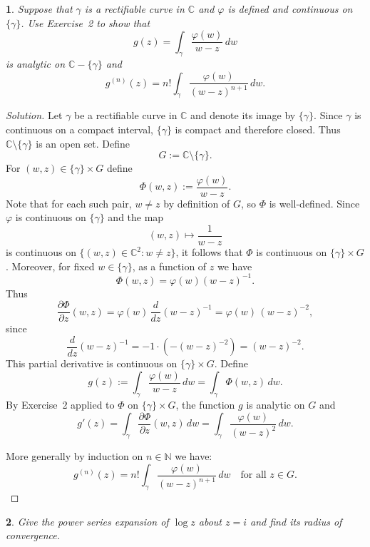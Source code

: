 \documentclass[12pt, a4paper]{report}
\theoremstyle{spaced}
\newtheorem{exercise}{}
\newcommand{\setexercise}[1]{\setcounter{exercise}{#1-1}}
\begin{document}
\setexercise{3}
\begin{exercise}
	Suppose that $\gamma$ is a rectifiable curve in $\mathbb{C}$ and $\varphi$ is defined and continuous on $\{\gamma\}$.
	Use Exercise~2 to show that
	\[
		g(z) = \int_{\gamma} \frac{\varphi(w)}{w - z}\, dw
	\]
	is analytic on $\mathbb{C} - \{\gamma\}$ and
	\[
		g^{(n)}(z) = n! \int_{\gamma} \frac{\varphi(w)}{(w-z)^{n+1}}\, dw.
	\]
\end{exercise}

\begin{proof}[Solution]
	Let $\gamma$ be a rectifiable curve in $\mathbb{C}$ and denote its image by $\{\gamma\}$.
	Since $\gamma$ is continuous on a compact interval, $\{\gamma\}$ is compact and therefore closed.
	Thus $\mathbb{C} \setminus \{\gamma\}$ is an open set.
	Define
	\[
		G := \mathbb{C} \setminus \{\gamma\}.
	\]
	For $(w,z) \in \{\gamma\} \times G$ define
	\[
		\Phi(w,z) := \frac{\varphi(w)}{w - z}.
	\]
	Note that for each such pair, $w \neq z$ by definition of $G$, so $\Phi$ is well-defined.
	Since $\varphi$ is continuous on $\{\gamma\}$ and the map
	\[
		(w,z) \mapsto \frac{1}{w-z}
	\]
	is continuous on $\{(w,z)\in\mathbb{C}^2 : w\neq z\}$, it follows that $\Phi$ is continuous on
	$\{\gamma\} \times G$.
	Moreover, for fixed $w\in\{\gamma\}$, as a function of $z$ we have
	\[
		\Phi(w,z) = \varphi(w)(w-z)^{-1}.
	\]
	Thus
	\[
		\frac{\partial \Phi}{\partial z}(w,z)
		= \varphi(w)\,\frac{d}{dz}(w-z)^{-1}
		= \varphi(w)\,(w-z)^{-2},
	\]
	since
	\[
		\frac{d}{dz}(w-z)^{-1}
		= -1\cdot(-(w-z)^{-2}) = (w-z)^{-2}.
	\]
	This partial derivative is continuous on $\{\gamma\}\times G$.
	Define
	\[
		g(z) := \int_\gamma \frac{\varphi(w)}{w-z}\,dw
		= \int_\gamma \Phi(w,z)\,dw.
	\]
	By Exercise~2 applied to $\Phi$ on $\{\gamma\}\times G$, the function $g$ is analytic on $G$
	and
	\[
		g'(z) = \int_\gamma \frac{\partial \Phi}{\partial z}(w,z)\,dw
		= \int_\gamma \frac{\varphi(w)}{(w-z)^2}\,dw.
	\]

	More generally by induction on $n\in\mathbb{N}$ we have:
	\[
		g^{(n)}(z) = n!\int_\gamma \frac{\varphi(w)}{(w-z)^{n+1}}\,dw
		\quad\text{for all }z\in G.
	\]
\end{proof}


\setexercise{5}
\begin{exercise}
	Give the power series expansion of $\log z$ about $z=i$ and find its radius of convergence.
\end{exercise}
\end{document}
